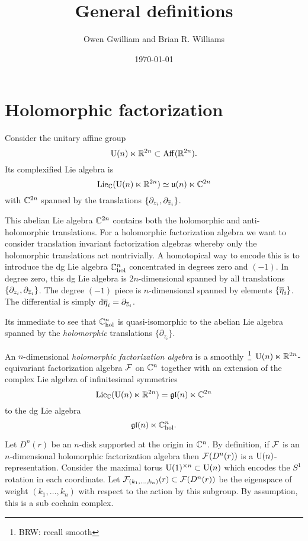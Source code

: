 \documentclass[11pt]{amsart}
\author{Owen Gwilliam and Brian R. Williams}
\date{\today}
\title{General definitions}
\def\U{{\rm U}}
\def\brian#1{{\textcolor{blue!65!red}{BRW: {#1}}}}
\begin{document}
\maketitle

\section{Holomorphic factorization}

Consider the unitary affine group 
\[
\U(n) \ltimes \RR^{2n} \subset {\rm Aff}(\RR^{2n}) .
\]
Its complexified Lie algebra is
\[
{\rm Lie}_{\CC} (\U(n) \ltimes \RR^{2n}) \simeq \mathfrak{u}(n) \ltimes \CC^{2n}
\]
with $\CC^{2n}$ spanned by the translations $\{\partial_{z_i}, \partial_{\zbar_i}\}$. 

This abelian Lie algebra $\CC^{2n}$ contains both the holomorphic and anti-holomorphic translations. 
For a holomorphic factorization algebra we want to consider translation invariant factorization algebras whereby only the holomorphic translations act nontrivially. 
A homotopical way to encode this is to introduce the dg Lie algebra $\CC^{n}_{\rm hol}$ concentrated in degrees zero and $(-1)$. 
In degree zero, this dg Lie algebra is $2n$-dimensional spanned by all translations $\{\partial_{z_i}, \partial_{\zbar_i}\}$.
The degree $(-1)$ piece is $n$-dimensional spanned by elements $\{\Bar{\eta}_i\}$. 
The differential is simply $\d \Bar{\eta}_i = \partial_{\zbar_i}$. 

Its immediate to see that $\CC^n_{\rm hol}$ is quasi-isomorphic to the abelian Lie algebra spanned by the {\em holomorphic} translations $\{\partial_{z_i}\}$. 

\begin{dfn}
An $n$-dimensional {\em holomorphic factorization algebra} is a smoothly~\footnote{\brian{recall smooth}}~$\U(n) \ltimes \RR^{2n}$-equivariant factorization algebra $\cF$ on $\CC^n$ together with an extension of the complex Lie algebra of infinitesimal symmetries
\[
{\rm Lie}_{\CC} (\U(n) \ltimes \RR^{2n}) = \mathfrak{gl}(n) \ltimes \CC^{2n}
\]
to the dg Lie algebra 
\[
\mathfrak{gl}(n) \ltimes \CC^{n}_{\rm hol} .
\]
\end{dfn}


Let $D^n(r)$ be an $n$-disk supported at the origin in $\CC^n$. 
By definition, if $\cF$ is an $n$-dimensional holomorphic factorization algebra then $\cF(D^n (r))$ is a $\U(n)$-representation. 
Consider the maximal torus $\U(1)^{\times n} \subset \U(n)$ which encodes the $S^1$ rotation in each coordinate. 
Let $\cF_{(k_1,\ldots, k_n)}(r) \subset \cF(D^n(r))$ be the eigenspace of weight $(k_1,\ldots, k_n)$ with respect to the action by this subgroup. 
By assumption, this is a sub cochain complex.
\end{document}
